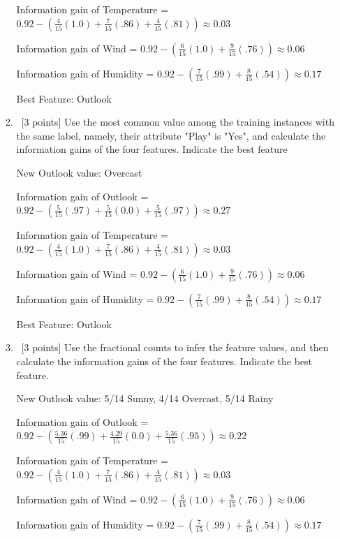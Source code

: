 \documentclass[12pt, fullpage,letterpaper]{article}
\begin{document}
\begin{enumerate}
\begin{enumerate}
\begin{framed}
	Information gain of Temperature = $0.92 - (\frac{4}{15}(1.0) + \frac{7}{15}(.86) + \frac{4}{15}(.81)) \approx 0.03$
	
	Information gain of Wind = $0.92 - (\frac{6}{15}(1.0) + \frac{9}{15}(.76)) \approx 0.06 $
	
	Information gain of Humidity = $0.92 - (\frac{7}{15}(.99) + \frac{8}{15}(.54)) \approx 0.17 $
	
	Best Feature: Outlook
\end{framed}
\item~[3 points] Use the most common value among the  training instances with the same label, namely, their attribute "Play" is "Yes", and calculate the information gains of the four features. Indicate the best feature
\begin{framed}
	  \newline
	New Outlook value: Overcast
	
	Information gain of Outlook = $0.92 - (\frac{5}{15}(.97) + \frac{5}{15}(0.0) + \frac{5}{15}(.97)) \approx 0.27 $
	
	Information gain of Temperature = $0.92 - (\frac{4}{15}(1.0) + \frac{7}{15}(.86) + \frac{4}{15}(.81)) \approx 0.03$
	
	Information gain of Wind = $0.92 - (\frac{6}{15}(1.0) + \frac{9}{15}(.76)) \approx 0.06 $
	
	Information gain of Humidity = $0.92 - (\frac{7}{15}(.99) + \frac{8}{15}(.54)) \approx 0.17 $
	
	Best Feature: Outlook
\end{framed}
\item~[3 points] Use the fractional counts to infer the feature values, and then calculate the information gains of the four features. Indicate the best feature.

\begin{framed}
	  \newline
	New Outlook value: {5/14 Sunny, 4/14 Overcast, 5/14 Rainy}
	
	Information gain of Outlook = $0.92 - (\frac{5.36}{15}(.99) + \frac{4.29}{15}(0.0) + \frac{5.36}{15}(.95)) \approx 0.22 $
	
	Information gain of Temperature = $0.92 - (\frac{4}{15}(1.0) + \frac{7}{15}(.86) + \frac{4}{15}(.81)) \approx 0.03$
	
	Information gain of Wind = $0.92 - (\frac{6}{15}(1.0) + \frac{9}{15}(.76)) \approx 0.06 $
	
	Information gain of Humidity = $0.92 - (\frac{7}{15}(.99) + \frac{8}{15}(.54)) \approx 0.17 $
	

\end{framed}
\end{enumerate}
\end{enumerate}
\end{document}
